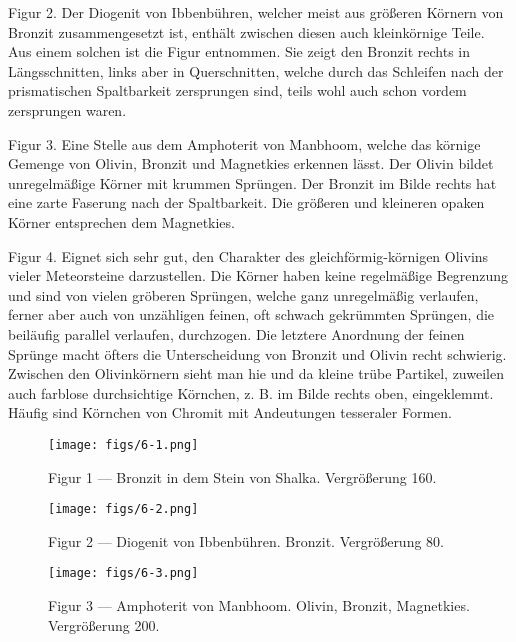 \documentclass[a4paper, 12pt, oneside]{article}
\begin{document}
Figur 2. Der Diogenit von Ibbenbühren, welcher meist aus größeren Körnern von Bronzit zusammengesetzt ist, enthält zwischen diesen auch kleinkörnige Teile. Aus einem solchen ist die Figur entnommen. Sie zeigt den Bronzit rechts in Längsschnitten, links aber in Querschnitten, welche durch das Schleifen nach der prismatischen Spaltbarkeit zersprungen sind, teils wohl auch schon vordem zersprungen waren.

Figur 3. Eine Stelle aus dem Amphoterit von Manbhoom, welche das körnige Gemenge von Olivin, Bronzit und Magnetkies erkennen lässt. Der Olivin bildet unregelmäßige Körner mit krummen Sprüngen. Der Bronzit im Bilde rechts hat eine zarte Faserung nach der Spaltbarkeit. Die größeren und kleineren opaken Körner entsprechen dem Magnetkies.

Figur 4. Eignet sich sehr gut, den Charakter des gleichförmig-körnigen Olivins vieler Meteorsteine darzustellen. Die Körner haben keine regelmäßige Begrenzung und sind von vielen gröberen Sprüngen, welche ganz unregelmäßig verlaufen, ferner aber auch von unzähligen feinen, oft schwach gekrümmten Sprüngen, die beiläufig parallel verlaufen, durchzogen. Die letztere Anordnung der feinen Sprünge macht öfters die Unterscheidung von Bronzit und Olivin recht schwierig. Zwischen den Olivinkörnern sieht man hie und da kleine trübe Partikel, zuweilen auch farblose durchsichtige Körnchen, z. B. im Bilde rechts oben, eingeklemmt. Häufig sind Körnchen von Chromit mit Andeutungen tesseraler Formen.
\clearpage

\vspace*{\fill}
\begin{figure}[H]
\centering
\texttt{[image: figs/6-1.png]}
\caption{\small Figur 1 --- Bronzit in dem Stein von Shalka. Vergrößerung 160.}
\end{figure}
\vspace*{\fill}
\clearpage

\vspace*{\fill}
\begin{figure}[H]
\centering
\texttt{[image: figs/6-2.png]}
\caption{\small Figur 2 --- Diogenit von Ibbenbühren. Bronzit. Vergrößerung 80.}
\end{figure}
\vspace*{\fill}
\clearpage

\vspace*{\fill}
\begin{figure}[H]
\centering
\texttt{[image: figs/6-3.png]}
\caption{\small Figur 3 --- Amphoterit von Manbhoom. Olivin, Bronzit, Magnetkies. Vergrößerung 200.}
\end{figure}
\vspace*{\fill}
\clearpage
\end{document}
